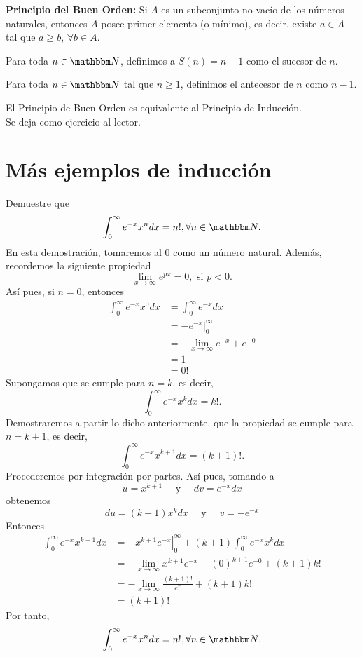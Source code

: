 \noindent\textbf{Principio del Buen Orden:} Si $A$ es un subconjunto no vacío de los números naturales, entonces $A$ posee primer elemento (o mínimo), es decir, existe $a \in A$ tal que $a \geq b$, $\forall b \in A$.

\begin{definition}
    Para toda $n \in \NN$, definimos a $S(n)=n+1$ como el sucesor de $n$.
\end{definition}

\begin{definition}
    Para toda $n \in \NN$ tal que $n \geq 1$, definimos el antecesor de $n$ como $n-1$.
\end{definition}

\begin{theorem}
    El Principio de Buen Orden es equivalente al Principio de Inducción. \\
    \demostracion Se deja como ejercicio al lector.
\end{theorem}

\section{Más ejemplos de inducción}

\begin{example}
    Demuestre que
    $$\int_{0}^{\infty} e^{-x}x^{n} dx=n!, \forall n \in \NN.$$
    \demostracion En esta demostración, tomaremos al $0$ como un número natural. Además, recordemos la siguiente propiedad
    $$\lim_{x \to \infty} e^{px}=0, \text{ si } p<0.$$
    Así pues, si $n=0$, entonces
    \begin{align*}
        \int_{0}^{\infty} e^{-x}x^0 dx &= \int_{0}^{\infty} e^{-x} dx \\
        &=\left. -e^{-x} \right|_{0}^{\infty} \\
        &=- \lim_{x \rightarrow \infty} e^{-x} + e^{-0} \\
        &=1 \\
        &=0!
    \end{align*}
    Supongamos que se cumple para $n=k$, es decir,
    $$\int_{0}^{\infty} e^{-x}x^{k} dx=k!.$$
    Demostraremos a partir lo dicho anteriormente, que la propiedad se cumple para $n=k+1$, es decir,
    $$\int_{0}^{\infty} e^{-x}x^{k+1} dx=(k+1)!.$$
    Procederemos por integración por partes. Así pues, tomando a
    $$u=x^{k+1} \quad \text{ y } \quad dv=e^{-x} dx$$
    obtenemos
    $$du=(k+1)x^k dx \quad \text{ y } \quad v=-e^{-x}$$
    Entonces
    \begin{align*}
        \int_{0}^{\infty} e^{-x}x^{k+1} dx &= \left. -x^{k+1}e^{-x} \right|_{0}^{\infty} + (k+1) \int_{0}^{\infty} e^{-x} x^k dx \\
        &=- \lim_{x \rightarrow \infty} x^{k+1}e^{-x}+(0)^{k+1}e^{-0}+(k+1)k! \\
        &=- \lim_{x \rightarrow \infty} \frac{(k+1)!}{e^x} +(k+1)k! \\
        &=(k+1)!
    \end{align*}
    Por tanto,
    $$\int_{0}^{\infty} e^{-x}x^{n} dx=n!, \forall n \in \NN.$$
\end{example}

